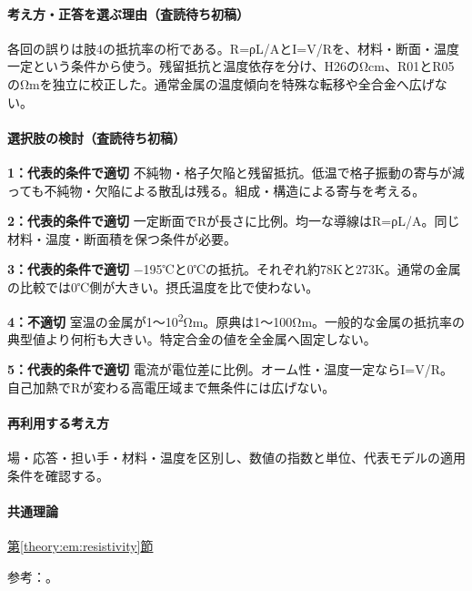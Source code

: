 \paragraph{考え方・正答を選ぶ理由（査読待ち初稿）} 各回の誤りは肢4の抵抗率の桁である。R=ρL/AとI=\allowbreak{}V/Rを、材料・断面・温度一定という条件から使う。残留抵抗と温度依存を分け、H26のΩcm、R01とR05のΩmを独立に校正した。通常金属の温度傾向を特殊な転移や全合金へ広げない。

\paragraph{選択肢の検討（査読待ち初稿）}\mbox{}\par

\noindent\textbf{1：代表的条件で適切} 不純物・格子欠陥と残留抵抗。低温で格子振動の寄与が減っても不純物・欠陥による散乱は残る。組成・構造による寄与を考える。\par

\noindent\textbf{2：代表的条件で適切} 一定断面でRが長さに比例。均一な導線はR=ρL/A。同じ材料・温度・断面積を保つ条件が必要。\par

\noindent\textbf{3：代表的条件で適切} −195℃と0℃の抵抗。それぞれ約78Kと273K。通常の金属の比較では0℃側が大きい。摂氏温度を比で使わない。\par

\noindent\textbf{4：不適切} 室温の金属が1〜10\textsuperscript{2}Ωm。原典は1〜100Ωm。一般的な金属の抵抗率の典型値より何桁も大きい。特定合金の値を全金属へ固定しない。\par

\noindent\textbf{5：代表的条件で適切} 電流が電位差に比例。オーム性・温度一定ならI=\allowbreak{}V/R。自己加熱でRが変わる高電圧域まで無条件には広げない。\par

\paragraph{再利用する考え方} 場・応答・担い手・材料・温度を区別し、数値の指数と単位、代表モデルの適用条件を確認する。

\paragraph{共通理論} \hyperref[theory:em:resistivity]{第\ref*{theory:em:resistivity}節}

\par 参考：\cite{openstax_resistivity,em51_resistance}。

